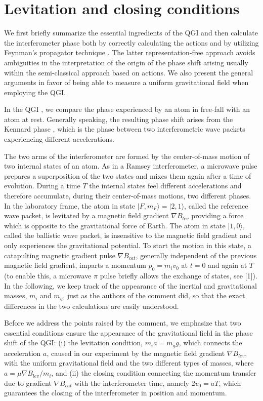 \documentclass[aps,prx,onecolumn,superscriptaddress,longbibliography]{revtex4-2}
\begin{document}
\section{Levitation and closing conditions}

We first briefly summarize the essential ingredients of the QGI and then calculate the interferometer phase both by correctly calculating the actions and by utilizing Feynman's propagator technique \cite{T3}. The latter representation-free approach \cite{Schleich-NJP, Schleich-PRL} avoids ambiguities in the interpretation of the origin of the phase shift arising usually within the semi-classical approach based on actions. We also present the general arguments in favor of being able to measure a uniform gravitational field when employing the QGI.

In the QGI \cite{QGI}, we compare the phase experienced by an atom in free-fall with an atom at rest. Generally speaking, the resulting phase shift arises from the Kennard phase \cite{T3,T3-PRL}, which is the phase between two interferometric wave packets experiencing different accelerations.

The two arms of the interferometer are formed by the center-of-mass motion of two internal states of an atom. As in a Ramsey interferometer, a microwave pulse prepares a superposition of the two states and mixes them again after a time of evolution. During a time $T$ the internal states feel different accelerations and therefore accumulate, during their center-of-mass motions, two different phases. In the laboratory frame, the atom in state $|F,m_F\rangle=|2,1\rangle$, called the reference wave packet, is levitated by a magnetic field gradient $\nabla B_{lev}$ providing a force which is opposite to the gravitational force of Earth. The atom in state $|1,0\rangle$, called the ballistic wave packet, is insensitive to the magnetic field gradient and only experiences the gravitational potential. To start the motion in this state, a catapulting magnetic gradient pulse $\nabla B_{cat}$, generally independent of the previous magnetic field gradient, imparts a momentum $p_0 = m_i v_0$ at $t = 0$ and
again at $T$ (to enable this, a microwave $\pi$ pulse briefly allows the exchange of states, see [1]). In the following, we keep track of the appearance of the inertial and gravitational masses, $m_i$ and $m_g$, just as the authors of the comment did, so that the exact differences in the two calculations are easily understood.

Before we address the points raised by the comment, we emphasize that two essential conditions ensure the appearance of the gravitational field in the phase shift of the QGI: (i) the levitation condition, $m_i a=m_g g$, which connects the acceleration $a$, caused in our experiment by the magnetic field gradient $\nabla B_{lev}$, with the uniform gravitational field and the two different types of masses, where $a=\mu \nabla B_{lev}/m_i$, and (ii) the closing condition connecting the momentum transfer due to gradient $\nabla B_{cat}$ with the interferometer time, namely $2v_0=aT$, which guarantees the closing of the interferometer in position and momentum.
\end{document}
